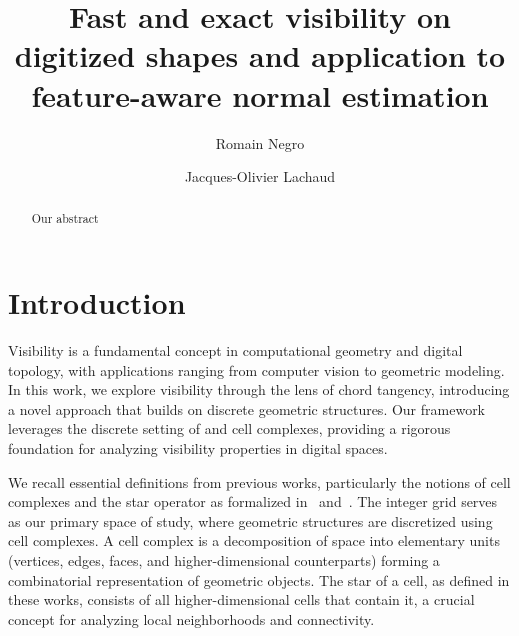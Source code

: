 \documentclass[runningheads]{llncs}
\begin{document}
%
    \title{Fast and exact visibility on digitized shapes and application to feature-aware normal estimation}
%
%
    \author{Romain Negro \and
    Jacques-Olivier Lachaud}
%
%
%
    \maketitle              %
%
    \begin{abstract}
        Our abstract
    \end{abstract}



    \section{Introduction}


    Visibility is a fundamental concept in computational geometry and digital topology, with applications ranging from computer vision to geometric modeling.
    In this work, we explore visibility through the lens of chord tangency, introducing a novel approach that builds on discrete geometric structures.
    Our framework leverages the discrete setting of and cell complexes, providing a rigorous foundation for analyzing visibility properties in digital spaces.

    We recall essential definitions from previous works, particularly the notions of cell complexes and the star operator as formalized in~\cite{lachaud:2021-dgmm} and~\cite{lachaud:2022-jmiv}.
    The integer grid serves as our primary space of study, where geometric structures are discretized using cell complexes.
    A cell complex is a decomposition of space into elementary units (vertices, edges, faces, and higher-dimensional counterparts) forming a combinatorial representation of geometric objects.
    The star of a cell, as defined in these works, consists of all higher-dimensional cells that contain it, a crucial concept for analyzing local neighborhoods and connectivity.
\end{document}
